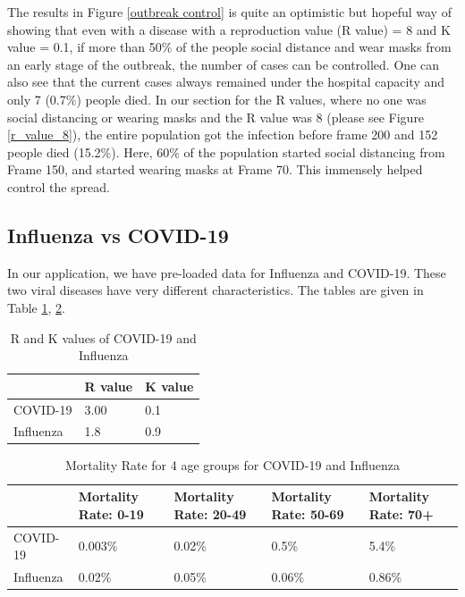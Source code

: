 \documentclass[11pt]{article}
\begin{document}
The results in Figure \ref{outbreak control} is quite an optimistic but hopeful way of showing that even with a disease with a reproduction value (R value) = 8 and K value = 0.1, if more than 50\% of the people social distance and wear masks from an early stage of the outbreak, the number of cases can be controlled. One can also see that the current cases always remained under the hospital capacity and only 7 (0.7\%) people died. In our section for the R values, where no one was social distancing or wearing masks and the R value was 8 (please see Figure \ref{r_value_8}), the entire population got the infection before frame 200 and 152 people died (15.2\%). Here, 60\% of the population started social distancing from Frame 150, and started wearing masks at Frame 70. This immensely helped control the spread.

\subsection{Influenza vs COVID-19}
In our application, we have pre-loaded data for Influenza\cite{influ_ref}\cite{k_val} and COVID-19\cite{cov_ref}\cite{k_val}. These two viral diseases have very different characteristics. The tables are given in Table \ref{analysis-rk}, \ref{analysis-mortality}. 

\begin{table}[H]
\begin{tabular}{|l|l|l|}

\hline
          & R value & K value \\ \hline
COVID-19  & 3.00    & 0.1    \\ \hline
Influenza & 1.8     & 0.9    \\ \hline
\end{tabular}
    \caption{\label{analysis-rk}R and K values of COVID-19 and Influenza}
\end{table}

\begin{table}[H]
\begin{tabular}{|l|l|l|l|l|}

\hline
          & Mortality Rate: 0-19 & Mortality Rate: 20-49 & Mortality Rate: 50-69 & Mortality Rate: 70+ \\ \hline
COVID-19  & 0.003\%              & 0.02\%                & 0.5\%                 & 5.4\%               \\ \hline
Influenza & 0.02\%               & 0.05\%                & 0.06\%                & 0.86\%             \\ \hline
\end{tabular}
\caption{\label{analysis-mortality}Mortality Rate for 4 age groups for COVID-19 and Influenza}
\end{table}
\end{document}
